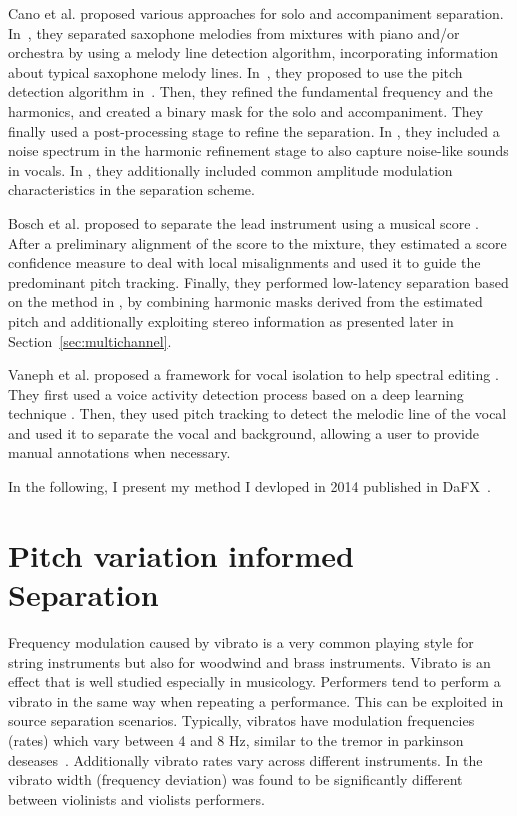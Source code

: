 Cano et al. proposed various approaches for solo and accompaniment separation. In~\cite{cano09}, they separated saxophone melodies from mixtures with piano and/or orchestra by using a melody line detection algorithm, incorporating information about typical saxophone melody lines. In~\cite{grollmisch11,dittmar12,cano12}, they proposed to use the pitch detection algorithm in~\cite{dressler11}. Then, they refined the fundamental frequency and the harmonics, and created a binary mask for the solo and accompaniment. They finally used a post-processing stage to refine the separation. In \cite{cano13}, they included a noise spectrum in the harmonic refinement stage to also capture noise-like sounds in vocals. In \cite{cano14}, they additionally included common amplitude modulation characteristics in the separation scheme.

Bosch et al. proposed to separate the lead instrument using a musical score \cite{bosch12}. After a preliminary alignment of the score to the mixture, they estimated a score confidence measure to deal with local misalignments and used it to guide the predominant pitch tracking. Finally, they performed low-latency separation based on the method in \cite{marxer12}, by combining harmonic masks derived from the estimated pitch and additionally exploiting stereo information as presented later in Section~\ref{sec:multichannel}.

Vaneph et al. proposed a framework for vocal isolation to help spectral editing \cite{vaneph16}. They first used a voice activity detection process based on a deep learning technique \cite{leglaive15}. Then, they used pitch tracking to detect the melodic line of the vocal and used it to separate the vocal and background, allowing a user to provide manual annotations when necessary.
\par
In the following, I present my method I devloped in 2014 published in DaFX~\cite{stoeter14}.

\section{Pitch variation informed Separation}
\label{sub:frequency_modulation}


Frequency modulation caused by vibrato is a very common playing style for string instruments but also for woodwind and brass instruments.
Vibrato is an effect that is well studied especially in musicology.
Performers tend to perform a vibrato in the same way when repeating a performance.
This can be exploited in source separation scenarios.
Typically, vibratos have modulation frequencies (rates) which vary between 4 and 8 Hz, similar to the tremor in parkinson deseases~\cite{fletcher01}.
Additionally vibrato rates vary across different instruments.
In \cite{macleod06} the vibrato width (frequency deviation) was found to be significantly different between violinists and violists performers.

